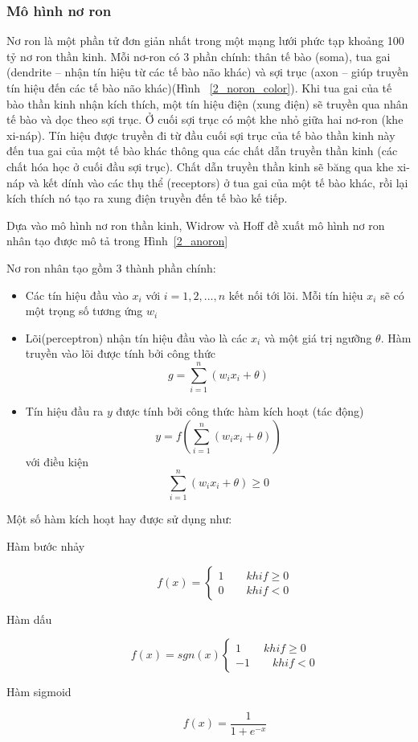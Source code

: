 \subsubsection{Mô hình nơ ron}
Nơ ron là một phần tử đơn giản nhất trong một mạng lưới  phức tạp khoảng 100 tỷ nơ ron thần kinh. 
Mỗi nơ-ron có 3 phần chính: thân tế bào (soma), tua gai (dendrite – nhận tín hiệu từ các tế bào não khác) và sợi trục (axon – giúp truyền tín hiệu đến các tế bào não khác)(Hình ~\ref{2_noron_color}). Khi tua gai của tế bào thần kinh nhận kích thích, một tín hiệu điện (xung điện) sẽ truyền qua nhân tế bào và dọc theo sợi trục. Ở cuối sợi trục có một khe nhỏ giữa hai nơ-ron (khe xi-náp). Tín hiệu được truyền đi từ đầu cuối sợi trục của tế bào thần kinh này đến tua gai của một tế bào khác thông qua các chất dẫn truyền thần kinh (các chất hóa học ở cuối đầu sợi trục). Chất dẫn truyền thần kinh sẽ băng qua khe xi-náp và kết dính vào các thụ thể (receptors) ở tua gai của một tế bào khác, rồi lại kích thích nó tạo ra xung điện truyền đến tế bào kế tiếp.
	
	Dựa vào mô hình nơ ron thần kinh, Widrow và Hoff đề xuất mô hình nơ ron nhân tạo \citep{wid60} được mô tả trong Hình~\ref{2_anoron}

Nơ ron nhân tạo gồm 3 thành phần chính:
\begin{itemize}
	\item Các tín hiệu đầu vào $x_i$ với $i=1,2,...,n$ kết nối tới lõi. Mỗi tín hiệu $x_i$ sẽ có một trọng số tương ứng $w_i$
	\item Lõi(perceptron) nhận tín hiệu đầu vào là các $x_i$ và một giá trị ngưỡng $\theta$. Hàm truyền vào lõi được tính bởi công thức \[
				g = \sum\limits_{i=1}^{n}(w_ix_i + \theta)
			\]
	\item Tín hiệu đầu ra $y$ được tính bởi công thức hàm kích hoạt (tác động) 
	\[
		y = f(\sum\limits_{i=1}^{n}(w_ix_i + \theta))	
	\]
	với điều kiện \[\sum\limits_{i=1}^{n}(w_ix_i + \theta) \geq 0\]
	\end{itemize}
Một số hàm kích hoạt hay được sử dụng như:
\begin{description}
\item[Hàm bước nhảy] \begin{equation}
						f(x)= \begin{cases}
									1 \qquad khi f \geq 0\\
									0 \qquad khi f < 0
								\end {cases}
					\end{equation}	
\item[Hàm dấu] \begin{equation}
						f(x)=sgn(x) \begin{cases}
									1 \qquad khi f \geq 0\\
									-1 \qquad khi f < 0
								\end {cases}
					\end{equation}	
\item [Hàm sigmoid]  \begin{equation}
						f(x) = \frac{1}{1+e^{-x}}
					\end{equation}	
\end{description}
